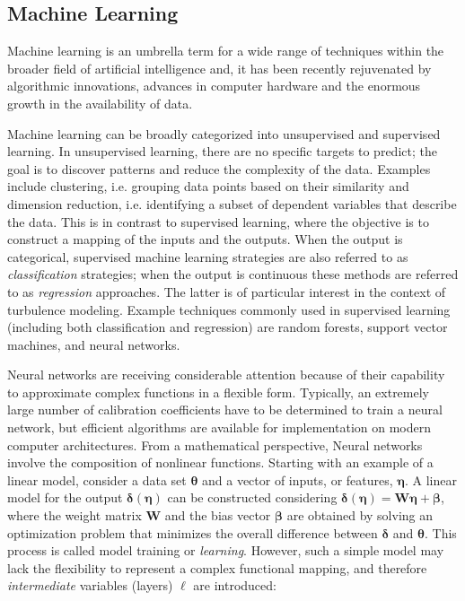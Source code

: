 \documentclass[a4paper]{ar-1col}
\begin{document}
 \begin{textbox}[h]\section{Machine Learning}
Machine learning is an umbrella term for a wide range of techniques within the broader field of artificial intelligence and, 
 it has been recently rejuvenated by  algorithmic innovations, advances in computer hardware and the enormous growth in the availability of data.


Machine learning can be broadly categorized into unsupervised  and supervised learning. In unsupervised learning, there are no specific targets to predict; the goal is to discover patterns and reduce the complexity of the data. Examples include clustering, i.e. grouping data points based on their  similarity and dimension reduction, i.e. identifying a subset of dependent variables that describe the data. This is in contrast to supervised learning, where the objective is to construct a mapping of the inputs and the outputs. When the output is categorical, supervised machine learning strategies are also referred to as {\it classification} strategies; when the output is continuous these methods are referred to as {\it regression} approaches. The  latter is of particular interest in the context of turbulence modeling. Example techniques commonly used in supervised learning (including both classification and regression) are random forests, support vector machines, and neural networks.

 Neural networks are receiving considerable attention  because of their capability to  approximate complex functions in a flexible form. Typically, an extremely large number of calibration coefficients have to be determined to train a neural network, but efficient algorithms are available for implementation on modern computer architectures. From a mathematical perspective, Neural networks involve the composition of nonlinear functions. 
Starting with an example of a linear model, consider a data set $\bm{\theta}$ and a vector of inputs, or features, $\bm{\eta}$. A linear model for the output $\bm{\delta}(\bm{\eta})$ can be constructed considering
$\bm{\delta}(\bm{\eta}) = \bm{W} \bm{\eta} + \bm{\beta}$, where the weight matrix $\bm{W}$ and the bias vector $ \bm{\beta}$ are obtained by solving an optimization problem that minimizes the overall difference between $\bm{\delta}$ and $\bm{\theta}$. This process is called model training or {\em learning}. However, such a simple model may lack the flexibility to represent a complex functional mapping, and therefore {\em intermediate} variables  (layers) $\bm{\ell}$ are introduced:


\end{textbox}
\end{document}
